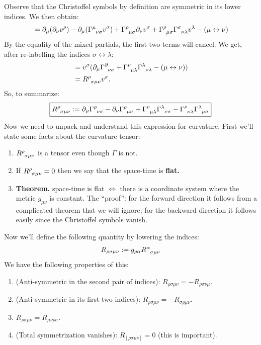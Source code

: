 \documentclass[11pt]{article}
\newcommand{\grmetric}[0]{g_{\mu \nu}}
\newcommand{\riemanntensor}[0]{\tensor{R}{^\rho_{\sigma \mu \nu}}}
\theoremstyle{definition}
\begin{document}
Observe that the Christoffel symbols by definition are symmetric in its lower indices. We then obtain: 
\begin{align*}
	& = \partial_\mu ( \partial_\nu v^\rho ) - \partial_\mu ( \tensor{\Gamma}{^\mu_{\nu \sigma}} v^\sigma) + \tensor{\Gamma}{^\rho_{\mu \sigma}} \partial_\nu v^\sigma + \tensor{\Gamma}{^\rho_{\mu \sigma}} \tensor{\Gamma}{^\sigma_{\nu \lambda}} v^\lambda - ( \mu \leftrightarrow \nu ) \\
\end{align*}
By the equality of the mixed partials, the first two terms will cancel. We get, after re-labelling the indices \( \sigma \leftrightarrow \lambda \): 
\begin{align*}
	& = v^\sigma ( \partial_\mu \tensor{\Gamma}{^\partial_{\nu \sigma}} + \tensor{\Gamma}{^\rho_{\mu \lambda}} \tensor{\Gamma}{^\lambda_{\nu \lambda}} - ( \mu \leftrightarrow \nu ) ) \\
	& = \riemanntensor v^\sigma. 
\end{align*}
So, to summarize: 
\begin{align}
\boxed{\riemanntensor := \partial_\mu \tensor{\Gamma}{^\rho_{\nu \sigma}} - \partial_\nu \tensor{\Gamma}{^\rho_{\mu \sigma}} + \tensor{\Gamma}{^\rho_{\mu \lambda}} \tensor{\Gamma}{^\lambda_{\nu \sigma}} - \tensor{\Gamma}{^\rho_{\nu \lambda}} \tensor{\Gamma}{^\lambda_{\mu \sigma}}}	
\end{align}
Now we need to unpack and understand this expression for curvature. First we'll state some facts about the curvature tensor: 
\begin{enumerate}[noitemsep]
	\item \( \riemanntensor \) is a tensor even though \( \Gamma \) is not. 
	\item If \( \riemanntensor = 0 \) then we say that the space-time is \textbf{flat.}
	\item \textbf{Theorem.} space-time is flat \( \iff \) there is a coordinate system where the metric \( \grmetric \) is constant. The ``proof'': for the forward direction it follows from a complicated theorem that we will ignore; for the backward direction it follows easily since the Christoffel symbols vanish. 
\end{enumerate}
Now we'll define the following quantity by lowering the indices: 
\begin{align*}
	R_{\rho \sigma \mu \nu} := g_{\rho \alpha} \tensor{R}{^\alpha_{\sigma \mu \nu}}
\end{align*}
We have the following properties of this: 
\begin{enumerate}[noitemsep]
	\item (Anti-symmetric in the second pair of indices): \( R_{\rho \sigma \mu \nu} = - R_{\rho \sigma \nu \mu} \). 
	\item (Anti-symmetric in its first two indices): \(  R_{\rho \sigma \mu \nu} = - R_{\sigma \rho \mu \nu} \). 
	\item \(  R_{\rho \sigma \mu \nu} = R_{\mu \nu \rho \sigma} \).
	\item (Total symmetrization vanishes): \( R_{[\rho \sigma \mu \nu ]} = 0 \) (this is important).
\end{enumerate}
\end{document}
